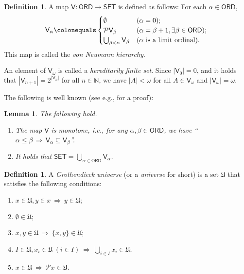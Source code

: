 \documentclass{surv-l}
\numberwithin{equation}{chapter}
\numberwithin{figure}{chapter}
\theoremstyle{plain}
\newtheorem{lem}[thm]{Lemma}
\theoremstyle{definition}
\newtheorem{dfn}[thm]{Definition}
\theoremstyle{remark}
\begin{document}
\begin{dfn}
A map $\mathsf{V} \colon \mathsf{ORD} \to \mathsf{SET}$ is defined as follows:
For each $\alpha \in \mathsf{ORD}$,
\[
\mathsf{V}_\alpha\colonequals 
\begin{cases}
\emptyset & ( \alpha = 0);\\
\mathcal{P}\mathsf{V}_\beta & (\alpha = \beta + 1, \exists \beta \in \mathsf{ORD});\\
\bigcup_{\beta < \alpha}\mathsf{V}_\beta & (\alpha \text{ is a limit ordinal}).
\end{cases}
\]
This map is called the \emph{von Neumann hierarchy}.

An element of $\mathsf{V}_\omega$ is called a \emph{hereditarily finite set}.
Since $|\mathsf{V}_0| = 0$, and it holds that $|\mathsf{V}_{n+1}| = 2^{|\mathsf{V}_n|}$ for all $n \in \mathbb{N}$,
we have $|A| < \omega$ for all $A \in \mathsf{V}_\omega$ and $|\mathsf{V}_\omega| = \omega$.
\end{dfn}

The following is well known (see e.g., \cite[Lemma 7.5.14, 7.5.18]{Ol} for a proof):

\begin{lem}The following hold.
\begin{enumerate}
\item
The map $\mathsf{V}$ is monotone, i.e., for any $\alpha, \beta \!\in\! \mathsf{ORD}$, we have
``$\alpha \!\le\! \beta \, \text{$\Rightarrow$}\,  \mathsf{V}_\alpha \subseteq \mathsf{V}_\beta$''.
\item
It holds that $\mathsf{SET} = \bigcup_{\alpha \in \mathsf{ORD}}\mathsf{V}_\alpha$.
\end{enumerate}
\end{lem}

\begin{dfn}\label{dfn:univ}
A \emph{Grothendieck universe} (or a \emph{universe} for short) is a set $\mathfrak{U}$
that satisfies the following conditions:
\begin{enumerate}
\item
$x \in \mathfrak{U}, y \in x \ \text{$\Rightarrow$}\  y \in \mathfrak{U}$;
\item
$\emptyset \in \mathfrak{U}$;
\item
$x, y \in \mathfrak{U} \ \text{$\Rightarrow$}\  \{x, y\} \in \mathfrak{U}$;
\item
$I \in \mathfrak{U}, x_i \in \mathfrak{U} \ (i \in I)\  \text{$\Rightarrow$}\  \bigcup_{i\in I} x_i \in \mathfrak{U}$;
\item
$x \in \mathfrak{U} \ \text{$\Rightarrow$}\  \mathcal{P} x \in \mathfrak{U}$.
\end{enumerate}
\end{dfn}
\end{document}
